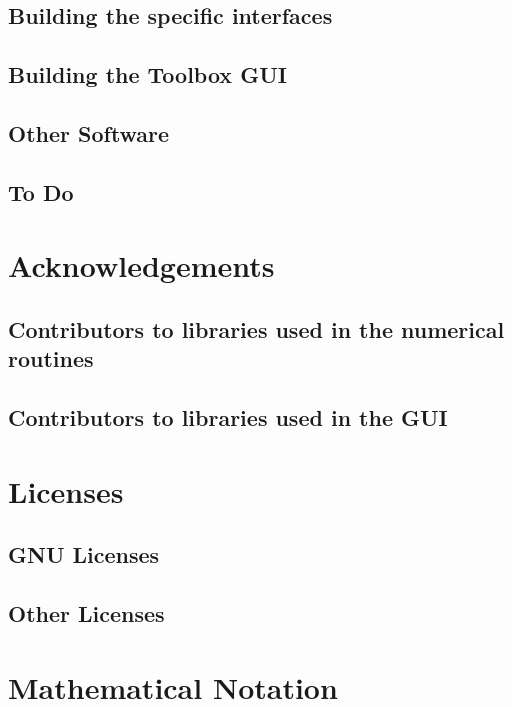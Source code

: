\documentclass[12pt,a4paper,openany]{book}
\begin{document}
\section{Building the specific interfaces}

\section{Building the Toolbox GUI}

\section{Other Software}

\section{To Do}

\chapter{Acknowledgements}

\section{Contributors to libraries used in the numerical routines}

\section{Contributors to libraries used in the GUI}

\chapter{Licenses}

\section{GNU Licenses}

\section{Other Licenses}

\chapter{Mathematical Notation}

\chapter{\tocbibname }
\end{document}
